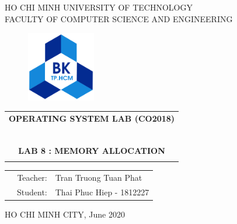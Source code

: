 \documentclass[a4paper]{article}
\begin{document}
\begin{titlepage}
\begin{center}
HO CHI MINH UNIVERSITY OF TECHNOLOGY \\
FACULTY OF COMPUTER SCIENCE AND ENGINEERING 
\end{center}

\vspace{1cm}

\begin{figure}[h!]
\begin{center}
\includegraphics[width=3cm]{hcmut.png}
\end{center}
\end{figure}

\vspace{1cm}


\begin{center}
\begin{tabular}{c}
\multicolumn{1}{c}{\textbf{{\Large OPERATING SYSTEM LAB (CO2018)}}}\\
~~\\
\hline
\\
\textbf{{\Huge LAB 8 : MEMORY ALLOCATION}}\\
\\
\hline
\end{tabular}
\end{center}

\vspace{3cm}

\begin{table}[h]
\begin{tabular}{rrl}
\hspace{5 cm} & Teacher: & Tran Truong Tuan Phat\\
& Student: & Thai Phuc Hiep - 1812227 \\
\end{tabular}
\end{table}

\vspace{4.7cm}

\begin{center}
{\footnotesize HO CHI MINH CITY, June 2020}
\end{center}
\end{titlepage}
\end{document}
